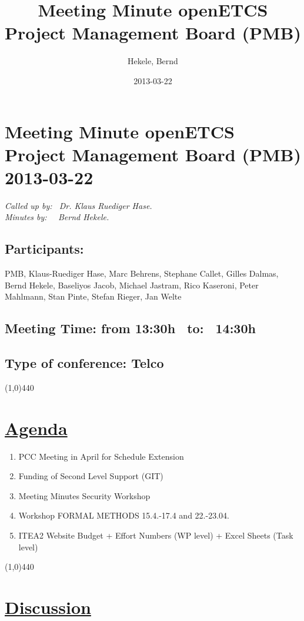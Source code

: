 \documentclass[a4paper]{article}
\title{Meeting Minute openETCS Project Management Board (PMB)}
\author{Hekele, Bernd}
\date{2013-03-22}
\begin{document}
\section*{\large{Meeting Minute openETCS Project Management Board (PMB) 2013-03-22}}

\emph{Called up by: \ Dr. Klaus Ruediger Hase.}\\
\emph{Minutes by: \ \  Bernd Hekele.}


\subsection*{Participants:} PMB, 
Klaus-Ruediger Hase, 
Marc Behrens, 
Stephane Callet,
Gilles Dalmas,
Bernd Hekele,
Baseliyos Jacob,
Michael Jastram, 
Rico Kaseroni, 
Peter Mahlmann, 
Stan Pinte,
Stefan Rieger, 
Jan Welte\\



\subsection*{Meeting Time: from 13:30h \ to: \ 14:30h}

\subsection*{Type of conference: Telco}

\line(1,0){440}
\section*{\underline{Agenda}}
\begin{enumerate}
\item PCC Meeting in April for Schedule Extension
\item Funding of Second Level Support (GIT)
\item Meeting Minutes Security Workshop
\item Workshop FORMAL METHODS 15.4.-17.4 and 22.-23.04.
\item ITEA2 Website Budget + Effort Numbers (WP level) + Excel Sheets (Task
level)


\end{enumerate}
\line(1,0){440}
\section*{\underline{Discussion}}
\end{document}
